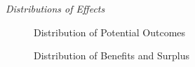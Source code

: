 
\begin{frame}\begin{center}
		\LARGE\textit{Distributions of Effects}
\end{center}\end{frame}
\begin{frame}
	\begin{figure}\caption{Distribution of Potential Outcomes}
	\end{figure}
\end{frame}
\begin{frame}
	\begin{figure}\caption{Distribution of Benefits and Surplus}
	\end{figure}
\end{frame}